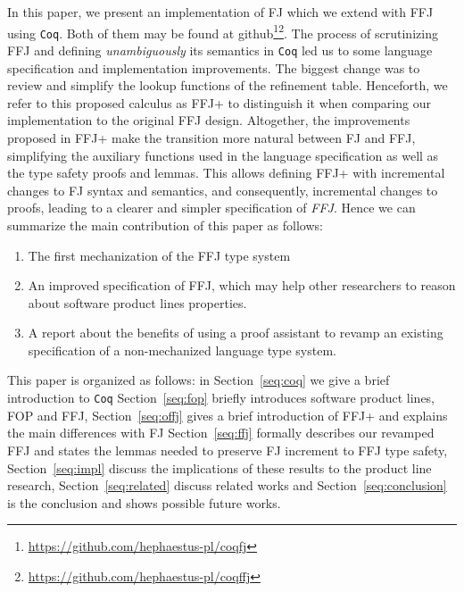 In this paper, we present an implementation of \ac{FJ} which we extend with \ac{FFJ} using \texttt{Coq}.
Both of them may be found at github\footnote{\url{https://github.com/hephaestus-pl/coqfj}}\footnote{\url{https://github.com/hephaestus-pl/coqffj}}.
The process of scrutinizing \ac{FFJ} and defining \textit{unambiguously} its semantics in \texttt{Coq} 
led us to some language specification and implementation improvements. The biggest change was to review and
simplify the lookup functions of the refinement table.
Henceforth, we refer to this proposed calculus as \ac{FFJ+} to distinguish it when comparing our implementation to the original \ac{FFJ} design.
Altogether, the improvements proposed in \ac{FFJ+} make the transition more natural between \ac{FJ} and \ac{FFJ}, 
simplifying the auxiliary functions used in the language specification as well as the type safety proofs and lemmas. 
This allows defining \ac{FFJ+} with incremental changes to \ac{FJ} syntax and semantics, 
and consequently, incremental changes to proofs, leading to a clearer and simpler specification of \textit{FFJ}.
Hence we can summarize the main contribution of this paper as follows:
\begin{enumerate}
    \item The first mechanization of the \ac{FFJ} type system
    \item An improved specification of FFJ, which may help other researchers to reason about software product lines properties.
    \item A report about the benefits of using a proof assistant 
    to revamp an existing specification of a non-mechanized language type system.
\end{enumerate}

This paper is organized as follows: in Section~\ref{seq:coq} we give a brief introduction to \texttt{Coq} 
Section~\ref{seq:fop} briefly introduces software product lines, \ac{FOP} and \ac{FFJ},
Section~\ref{seq:offj} gives a brief introduction of  \ac{FFJ+} and explains the main differences with \ac{FJ}
Section~\ref{seq:ffj} formally describes our revamped \ac{FFJ} and states the lemmas needed to preserve \ac{FJ} increment to \ac{FFJ} type safety, 
Section~\ref{seq:impl} discuss the implications of these results to the product line research,
Section~\ref{seq:related} discuss related works and
Section~\ref{seq:conclusion} is the conclusion and shows possible future works.
